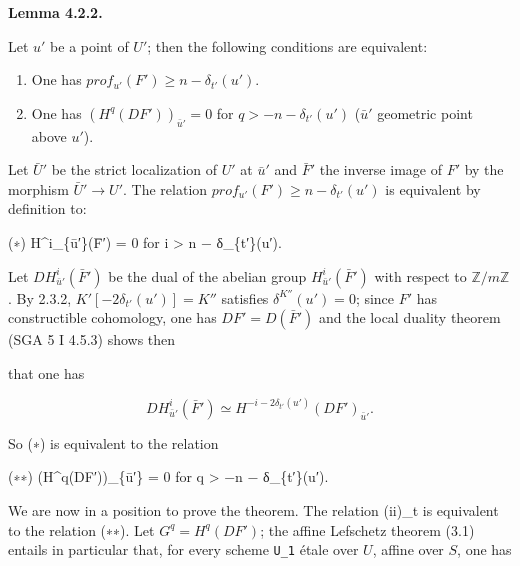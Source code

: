 \documentclass[
  11pt,
  a4paper,
]{book}
\newenvironment{Shaded}{}{}
\newcommand{\NormalTok}[1]{#1}
\begin{document}
\textbf{Lemma 4.2.2.}

Let \(u'\) be a point of \(U'\); then the following conditions are
equivalent:

\begin{enumerate}
\def\labelenumi{(\roman{enumi})}
\item
  One has \(prof_{u'}(F') \geqslant n - \delta_{t'}(u')\).
\item
  One has \((H^{q}(DF'))_{\bar{u}'} = 0\) for
  \(q > -n - \delta_{t'}(u')\) (\(\bar{u}'\) geometric point above
  \(u'\)).
\end{enumerate}

Let \(\bar{U}'\) be the strict localization of \(U'\) at \(\bar{u}'\)
and \(\bar{F}'\) the inverse image of \(F'\) by the morphism
\(\bar{U}' \to U'\). The relation
\(prof_{u'}(F') \geqslant n - \delta_{t'}(u')\) is equivalent by
definition to:

\begin{Shaded}
\begin{Highlighting}[]
\NormalTok{(∗) H\^{}i\_\{ū′\}(F̄′) = 0 for i \textgreater{} n − δ\_\{t′\}(u′).}
\end{Highlighting}
\end{Shaded}

Let \(DH^{i}_{\bar{u}'}(\bar{F}')\) be the dual of the abelian group
\(H^{i}_{\bar{u}'}(\bar{F}')\) with respect to
\(\mathbb{Z}/m\mathbb{Z}\). By 2.3.2, \(K'[-2 \delta_{t'}(u')] = K''\)
satisfies \(\delta^{K''}(u') = 0\); since \(F'\) has constructible
cohomology, one has \(DF' = D(\bar{F}')\) and the local duality theorem
(SGA 5 I 4.5.3) shows then

that one has

\[ DH^{i}_{\bar{u}'}(\bar{F}') \simeq H^{-i - 2 \delta_{t'}(u')}(DF')_{\bar{u}'}. \]

So (∗) is equivalent to the relation

\begin{Shaded}
\begin{Highlighting}[]
\NormalTok{(∗∗) (H\^{}q(DF′))\_\{ū′\} = 0 for q \textgreater{} −n − δ\_\{t′\}(u′).}
\end{Highlighting}
\end{Shaded}

We are now in a position to prove the theorem. The relation (ii)\_t is
equivalent to the relation (∗∗). Let \(G^{q} =
H^{q}(DF')\); the affine Lefschetz theorem (3.1) entails in particular
that, for every scheme \texttt{U\_1} étale over \(U\), affine over
\(S\), one has
\end{document}
